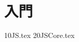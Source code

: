 \newcommand{\JSDir}{JavaScript/}
\newcommand{\InputFile}[1]{\expandafter \JSDir #1}
\chapter{\JS 入門}
\InputFile{10JS.tex}
\InputFile{20JSCore.tex}
